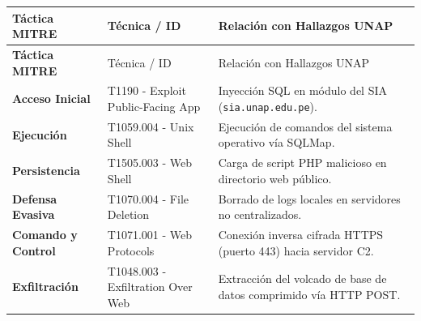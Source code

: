\begin{center}
\small
\begin{longtable}{>{\bfseries}p{3.2cm} p{4.2cm} p{7.5cm}}
\toprule
\rowcolor{outermarginbgcolor}
Táctica MITRE & Técnica / ID & Relación con Hallazgos UNAP \\
\midrule
\endfirsthead
\toprule
\rowcolor{outermarginbgcolor}
Táctica MITRE & Técnica / ID & Relación con Hallazgos UNAP \\
\midrule
\endhead
\bottomrule
\endfoot
Acceso Inicial & T1190 - Exploit Public-Facing App & Inyección SQL en módulo del SIA (\texttt{sia.unap.edu.pe}). \\
\midrule
Ejecución & T1059.004 - Unix Shell & Ejecución de comandos del sistema operativo vía SQLMap. \\
\midrule
Persistencia & T1505.003 - Web Shell & Carga de script PHP malicioso en directorio web público. \\
\midrule
Defensa Evasiva & T1070.004 - File Deletion & Borrado de logs locales en servidores no centralizados. \\
\midrule
Comando y Control & T1071.001 - Web Protocols & Conexión inversa cifrada HTTPS (puerto 443) hacia servidor C2. \\
\midrule
Exfiltración & T1048.003 - Exfiltration Over Web & Extracción del volcado de base de datos comprimido vía HTTP POST. \\
\bottomrule
\end{longtable}
\end{center}
